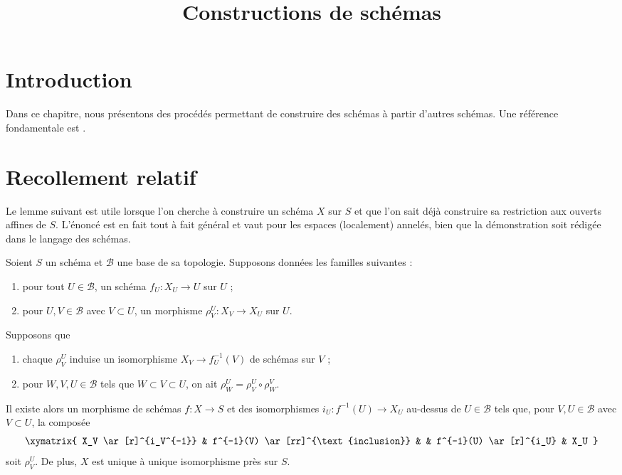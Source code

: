 

%


\title{Constructions de schémas}


\maketitle

\label{section-phantom}

\tableofcontents

\section{Introduction}
\label{section-introduction}

\noindent
Dans ce chapitre, nous présentons des procédés permettant de construire des
schémas à partir d'autres schémas. Une référence fondamentale est \cite{EGA}.


\section{Recollement relatif}
\label{section-relative-glueing}

\noindent
Le lemme suivant est utile lorsque l'on cherche à construire un schéma $X$
sur $S$ et que l'on sait déjà construire sa restriction aux ouverts affines
de $S$. L'énoncé est en fait tout à fait général et vaut pour les espaces
(localement) annelés, bien que la démonstration soit rédigée dans le langage
des schémas.

\begin{lemma}
\label{lemma-relative-glueing}
Soient $S$ un schéma et $\mathcal{B}$ une base de sa topologie.
Supposons données les familles suivantes :
\begin{enumerate}
\item pour tout $U \in \mathcal{B}$, un schéma $f_U : X_U \to U$ sur $U$ ;
\item pour $U, V \in \mathcal{B}$ avec $V \subset U$, un morphisme
$\rho^U_V : X_V \to X_U$ sur $U$.
\end{enumerate}
Supposons que
\begin{enumerate}
\item[(a)] chaque $\rho^U_V$ induise un isomorphisme
$X_V \to f_U^{-1}(V)$ de schémas sur $V$ ;
\item[(b)] pour $W, V, U \in \mathcal{B}$ tels que
$W \subset V \subset U$, on ait $\rho^U_W = \rho^U_V \circ \rho ^V_W$.
\end{enumerate}
Il existe alors un morphisme de schémas $f : X \to S$ et des isomorphismes
$i_U : f^{-1}(U) \to X_U$ au-dessus de $U \in \mathcal{B}$ tels que,
pour $V, U \in \mathcal{B}$ avec $V \subset U$, la composée
$$
\xymatrix{
X_V \ar[r]^{i_V^{-1}} &
f^{-1}(V) \ar[rr]^{\text{inclusion}} & &
f^{-1}(U) \ar[r]^{i_U} &
X_U
}
$$
soit $\rho^U_V$. De plus, $X$ est unique à unique isomorphisme près sur $S$.
\end{lemma}

